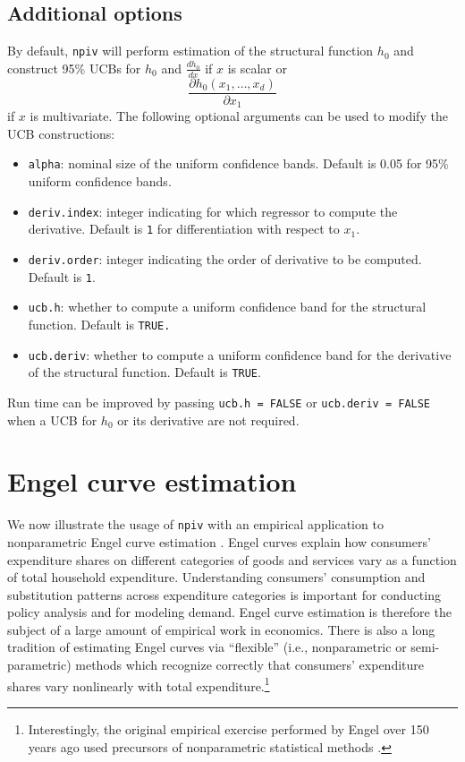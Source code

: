 \documentclass[
]{jss}
\begin{document}
\subsection{Additional options}\label{additional-options}

By default, \texttt{npiv} will perform estimation of the structural
function \(h_0\) and construct 95\% UCBs for \(h_0\) and
\(\frac{d h_0}{dx}\) if \(x\) is scalar or \[
 \frac{\partial h_0(x_1,\ldots,x_d)}{\partial x_1}
\] if \(x\) is multivariate. The following optional arguments can be
used to modify the UCB constructions:

\begin{itemize}
\item
  \texttt{alpha}: nominal size of the uniform confidence bands. Default
  is 0.05 for 95\% uniform confidence bands.
\item
  \texttt{deriv.index}: integer indicating for which regressor to
  compute the derivative. Default is \texttt{1} for differentiation with
  respect to \(x_1\).
\item
  \texttt{deriv.order}: integer indicating the order of derivative to be
  computed. Default is \texttt{1}.
\item
  \texttt{ucb.h}: whether to compute a uniform confidence band for the
  structural function. Default is \texttt{TRUE.}
\item
  \texttt{ucb.deriv}: whether to compute a uniform confidence band for
  the derivative of the structural function. Default is \texttt{TRUE}.
\end{itemize}

Run time can be improved by passing \texttt{ucb.h\ =\ FALSE} or
\texttt{ucb.deriv\ =\ FALSE} when a UCB for \(h_0\) or its derivative
are not required.

\section{Engel curve estimation}\label{engel}

We now illustrate the usage of \texttt{npiv} with an empirical
application to nonparametric Engel curve estimation \citep{BCK}. Engel
curves explain how consumers' expenditure shares on different categories
of goods and services vary as a function of total household expenditure.
Understanding consumers' consumption and substitution patterns across
expenditure categories is important for conducting policy analysis and
for modeling demand. Engel curve estimation is therefore the subject of
a large amount of empirical work in economics. There is also a long
tradition of estimating Engel curves via ``flexible'' (i.e.,
nonparametric or semi-parametric) methods which recognize correctly that
consumers' expenditure shares vary nonlinearly with total
expenditure.\footnote{Interestingly, the original empirical exercise
  performed by Engel over 150 years ago used precursors of nonparametric
  statistical methods \citep{CM}.}
\end{document}
